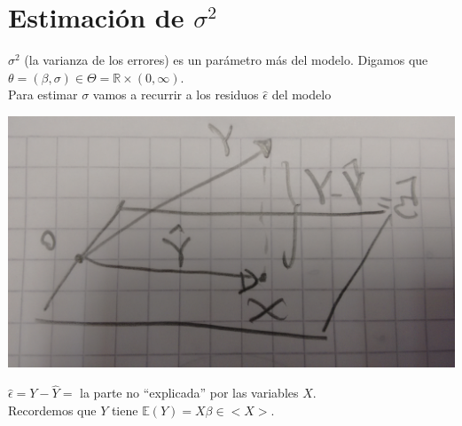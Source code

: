 \documentclass[10pt]{article}
\theoremstyle{plain}
\theoremstyle{definition}
\begin{document}
\section{Estimación de $\sigma^2$}
$\sigma^2$ (la varianza de los errores) es un parámetro más del modelo. Digamos que $\theta = (\beta, \sigma) \in \Theta = \mathbb{R}\times(0,\infty)$.\\

Para estimar $\sigma$ vamos a recurrir a los residuos $\hat{\epsilon}$ del modelo
\begin{center}
\includegraphics[scale=0.1]{imagenes/proyeccion.jpg}
\end{center}

$\hat{\epsilon} = Y - \hat{Y} = $ la parte no ``explicada'' por las variables $X$.\\

Recordemos que $Y$ tiene $\mathbb{E}(Y) = X\beta \in <X>$.\\
\end{document}
